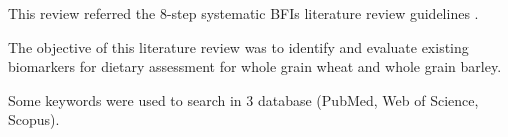 This review referred the 8-step systematic BFIs literature review guidelines\cite{Pratico2018} . 

The objective of this literature review was to identify and evaluate existing biomarkers for dietary assessment for whole grain wheat and whole grain barley.

Some keywords were used to search in 3 database (PubMed, Web of Science, Scopus).